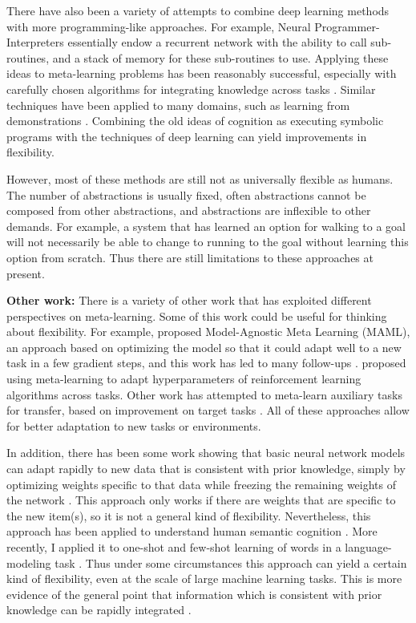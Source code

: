 There have also been a variety of attempts to combine deep learning methods with more programming-like approaches. For example, Neural Programmer-Interpreters \citep{Reed2015} essentially endow a recurrent network with the ability to call sub-routines, and a stack of memory for these sub-routines to use. Applying these ideas to meta-learning problems has been reasonably successful, especially with carefully chosen algorithms for integrating knowledge across tasks \citep[e.g.]{Devlin2017}. Similar techniques have been applied to many domains, such as learning from demonstrations \citep[e.g.][]{Xu2017a}. Combining the old ideas of cognition as executing symbolic programs \citep{Newell1961} with the techniques of deep learning can yield improvements in flexibility. \par  
However, most of these methods are still not as universally flexible as humans. The number of abstractions is usually fixed, often abstractions cannot be composed from other abstractions, and abstractions are inflexible to other demands. For example, a system that has learned an option for walking to a goal will not necessarily be able to change to running to the goal without learning this option from scratch. Thus there are still limitations to these approaches at present. \par 
\textbf{Other work:} There is a variety of other work that has exploited different perspectives on meta-learning. Some of this work could be useful for thinking about flexibility. For example, \citet{Finn2017a} proposed Model-Agnostic Meta Learning (MAML), an approach based on optimizing the model so that it could adapt well to a new task in a few gradient steps, and this work has led to many follow-ups \citep[e.g.][]{Finn2017, Finn2018, Nichol2018}. \citet{Xu2018} proposed using meta-learning to adapt hyperparameters of reinforcement learning algorithms across tasks. Other work has attempted to meta-learn auxiliary tasks for transfer, based on improvement on target tasks \citep{Liu2019a}. All of these approaches allow for better adaptation to new tasks or environments. \par
In addition, there has been some work showing that basic neural network models can adapt rapidly to new data that is consistent with prior knowledge, simply by optimizing weights specific to that data while freezing the remaining weights of the network \citep{Rumelhart1993}. This approach only works if there are weights that are specific to the new item(s), so it is not a general kind of flexibility. Nevertheless, this approach has been applied to understand human semantic cognition \citep{Rogers2004}. More recently, I applied it to one-shot and few-shot learning of words in a language-modeling task \citep{Lampinen2018a}. Thus under some circumstances this approach can yield a certain kind of flexibility, even at the scale of large machine learning tasks. This is more evidence of the general point that information which is consistent with prior knowledge can be rapidly integrated \citep{McClelland2013}. \par 
